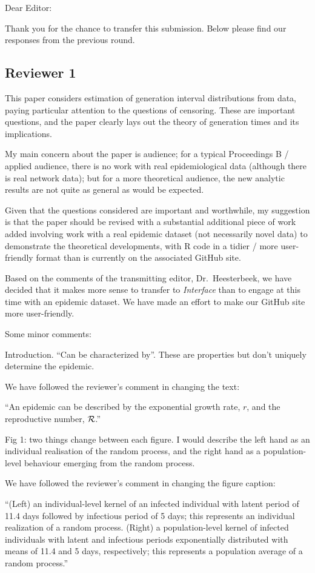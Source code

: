\documentclass[12pt]{article}
\newcommand{\RR}{\ensuremath{{\cal R}}}
\newcommand{\rev}{\subsection*}
\newcommand{\revtext}{\textsf}
\begin{document}
\noindent Dear Editor:

Thank you for the chance to transfer this submission. 
Below please find our responses from the previous round.

\rev{Reviewer 1}

\revtext{This paper considers estimation of generation interval distributions from data, paying particular attention to the questions of censoring. These are important questions, and the paper clearly lays out the theory of generation times and its implications.}

\revtext{My main concern about the paper is audience; for a typical Proceedings B / applied audience, there is no work with real epidemiological data (although there is real network data); but for a more theoretical audience, the new analytic results are not quite as general as would be expected.}

\revtext{Given that the questions considered are important and worthwhile, my suggestion is that the paper should be revised with a substantial additional piece of work added involving work with a real epidemic dataset (not necessarily novel data) to demonstrate the theoretical developments, with R code in a tidier / more user-friendly format than is currently on the associated GitHub site.
}

Based on the comments of the transmitting editor, Dr.~Heesterbeek, we have decided that it makes more sense to transfer to \emph{Interface} than to engage at this time with an epidemic dataset. We have made an effort to make our GitHub site more user-friendly.

\revtext{Some minor comments:}

\revtext{Introduction. “Can be characterized by”. These are properties but don’t uniquely determine the epidemic.}

We have followed the reviewer's comment in changing the text:

``An epidemic can be described by the exponential growth rate, $r$, and the reproductive number, \RR.''

\revtext{Fig 1: two things change between each figure. I would describe the left hand as an individual realisation of the random process, and the right hand as a population-level behaviour emerging from the random process.}

We have followed the reviewer's comment in changing the figure caption:

``(Left) an individual-level kernel of an infected individual with latent period of 11.4 days followed by infectious period of 5 days;
this represents an individual realization of a random process.
(Right) a population-level kernel of infected individuals with latent and infectious periods exponentially distributed with means of 11.4 and 5 days, respectively;
this represents a population average of a random process.''
\end{document}
